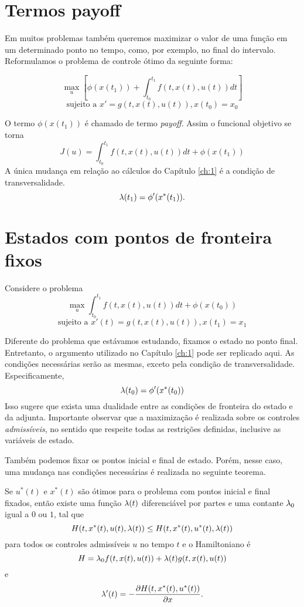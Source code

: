 \section{Termos payoff}

Em muitos problemas também queremos maximizar o valor de uma função em um
determinado ponto no tempo, como, por exemplo, no final do intervalo.
Reformulamos o problema de controle ótimo da seguinte forma:

\begin{equation*}
    \max_u \left[\phi(x(t_1)) + \int_{t_0}^{t_1} f(t, x(t),u(t))dt\right] 
\end{equation*}
\begin{equation*}
    \text{sujeito a } x' = g(t,x(t),u(t)), x(t_0) = x_0
\end{equation*}

O termo $\phi(x(t_1))$ é chamado de termo \textit{payoff}. Assim o
funcional objetivo se torna 
$$
J(u) = \int_{t_0}^{t_1} f(t,x(t),u(t))dt + \phi(x(t_1))
$$
A única mudança em relação ao cálculos do Capítulo \ref{ch:1} é a condição de transversalidade. 
$$\lambda(t_1) = \phi '(x^*(t_1)).$$ 

\section{Estados com pontos de fronteira fixos}

Considere o problema  
$$
\max_u \int_{t_0}^{t_1} f(t,x(t), u(t)) dt + \phi(x(t_0)) 
$$
$$
\text{sujeito a  }x'(t) = g(t,x(t),u(t)), x(t_1) = x_1
$$

Diferente do problema que estávamos estudando, fixamos o estado no ponto
final. Entretanto, o argumento utilizado no Capítulo \ref{ch:1} pode ser
replicado aqui. As condições necessárias serão as mesmas, exceto pela
condição de transversalidade. Especificamente, 
$$
\lambda(t_0) = \phi '(x^*(t_0))
$$
Isso sugere que exista uma dualidade entre as condições de fronteira do estado
e da adjunta. Importante observar que a maximização é realizada sobre os
controles \textit{admissíveis}, no sentido que respeite todas as restrições
definidas, inclusive as variáveis de estado. 

Também podemos fixar os pontos inicial e final de estado. Porém, nesse
caso, uma mudança nas condições necessárias é realizada no seguinte teorema. 

\begin{theorem}
    Se $u^*(t)$ e $x^*(t)$ são ótimos para o problema com pontos inicial e
    final fixados, então existe uma função $\lambda(t)$ diferenciável por partes e
    uma contante $\lambda_0$ igual a $0$ ou $1$, tal que 
    $$
    H(t,x^*(t),u(t),\lambda(t)) \le H(t,x^*(t),u^*(t), \lambda(t))
    $$
    para todos os controles admissíveis $u$ no tempo $t$ e o Hamiltoniano é 
    $$H = \lambda_0f(t,x(t),u(t)) + \lambda(t)g(t,x(t),u(t))$$ e
    $$\lambda '(t) = - \dfrac{\partial H(t,x^*(t), u^*(t))}{\partial x}.$$ 
\end{theorem}

